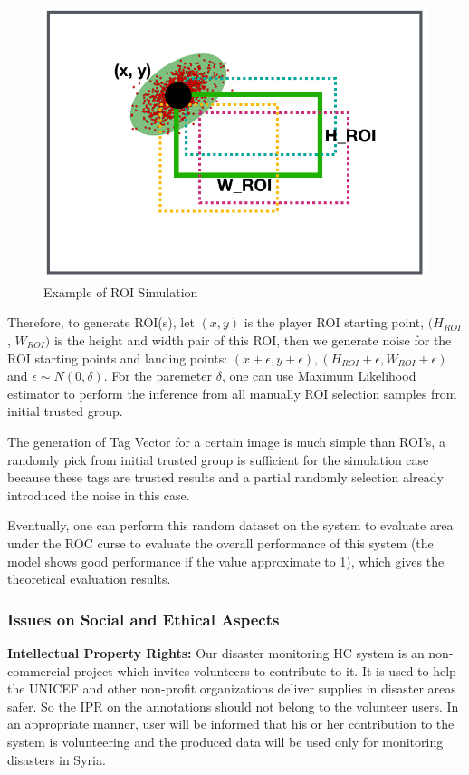 \begin{figure}[htp]
\centering
\includegraphics[width=0.5\columnwidth]{figures/evaluation}
\caption{Example of ROI Simulation}
\label{fig:evaluation}
\end{figure}

Therefore, to generate ROI(s), let $(x, y)$ is the player ROI starting point, $(H_{ROI}$, $W_{ROI})$ is the height
and width pair of this ROI, then we generate noise for the ROI starting points and landing points: 
$(x+\epsilon, y+\epsilon), (H_{ROI}+\epsilon, W_{ROI}+\epsilon)$ and $\epsilon \sim N(0, \delta)$.
For the paremeter $\delta$, one can use Maximum Likelihood estimator \cite{johansen1990maximum} 
to perform the inference from all manually ROI selection samples from initial trusted group.

The generation of Tag Vector for a certain image is much simple than ROI's, 
a randomly pick from initial trusted group is sufficient for the simulation case 
because these tags are trusted results and a partial randomly selection already introduced the noise in this case.

Eventually, one can perform this random dataset on the system to evaluate area under the ROC curse to
evaluate the overall performance of this system (the model shows good performance if the value approximate to 1), 
which gives the theoretical evaluation results.

\subsubsection{Issues on Social and Ethical Aspects}
\label{chapter:ethical}

\textbf{Intellectual Property Rights:} 
Our disaster monitoring HC system is an non-commercial project which invites volunteers to contribute to it. 
It is used to help the UNICEF and other non-profit organizations deliver supplies in disaster areas safer. 
So the IPR on the annotations should not belong to the volunteer users. In an appropriate manner, user will be informed that 
his or her contribution to the system is volunteering and the produced data will be used only for 
monitoring disasters in Syria.

